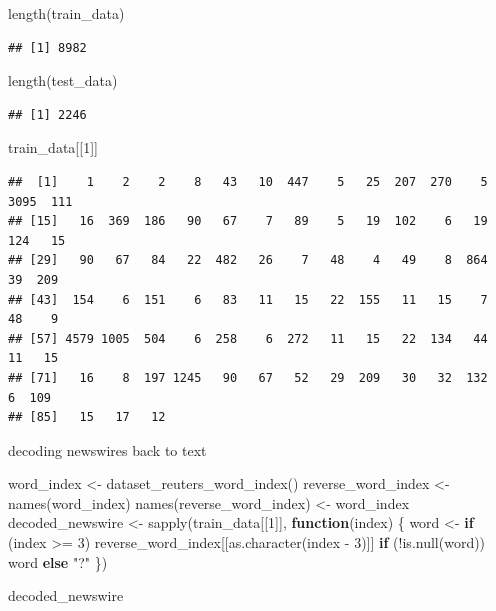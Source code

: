 \documentclass[]{article}
\newenvironment{Shaded}{\begin{snugshade}}{\end{snugshade}}
\newcommand{\ControlFlowTok}[1]{\textcolor[rgb]{0.13,0.29,0.53}{\textbf{#1}}}
\newcommand{\DecValTok}[1]{\textcolor[rgb]{0.00,0.00,0.81}{#1}}
\newcommand{\FunctionTok}[1]{\textcolor[rgb]{0.00,0.00,0.00}{#1}}
\newcommand{\NormalTok}[1]{#1}
\newcommand{\OtherTok}[1]{\textcolor[rgb]{0.56,0.35,0.01}{#1}}
\newcommand{\SpecialCharTok}[1]{\textcolor[rgb]{0.00,0.00,0.00}{#1}}
\newcommand{\StringTok}[1]{\textcolor[rgb]{0.31,0.60,0.02}{#1}}
\begin{document}
\begin{Shaded}
\begin{Highlighting}[]
\FunctionTok{length}\NormalTok{(train\_data)}
\end{Highlighting}
\end{Shaded}

\begin{verbatim}
## [1] 8982
\end{verbatim}

\begin{Shaded}
\begin{Highlighting}[]
\FunctionTok{length}\NormalTok{(test\_data)}
\end{Highlighting}
\end{Shaded}

\begin{verbatim}
## [1] 2246
\end{verbatim}

\begin{Shaded}
\begin{Highlighting}[]
\NormalTok{train\_data[[}\DecValTok{1}\NormalTok{]]}
\end{Highlighting}
\end{Shaded}

\begin{verbatim}
##  [1]    1    2    2    8   43   10  447    5   25  207  270    5 3095  111
## [15]   16  369  186   90   67    7   89    5   19  102    6   19  124   15
## [29]   90   67   84   22  482   26    7   48    4   49    8  864   39  209
## [43]  154    6  151    6   83   11   15   22  155   11   15    7   48    9
## [57] 4579 1005  504    6  258    6  272   11   15   22  134   44   11   15
## [71]   16    8  197 1245   90   67   52   29  209   30   32  132    6  109
## [85]   15   17   12
\end{verbatim}

decoding newswires back to text

\begin{Shaded}
\begin{Highlighting}[]
\NormalTok{word\_index }\OtherTok{\textless{}{-}} \FunctionTok{dataset\_reuters\_word\_index}\NormalTok{()}
\NormalTok{reverse\_word\_index }\OtherTok{\textless{}{-}} \FunctionTok{names}\NormalTok{(word\_index) }
\FunctionTok{names}\NormalTok{(reverse\_word\_index) }\OtherTok{\textless{}{-}}\NormalTok{ word\_index}
\NormalTok{decoded\_newswire }\OtherTok{\textless{}{-}} \FunctionTok{sapply}\NormalTok{(train\_data[[}\DecValTok{1}\NormalTok{]], }\ControlFlowTok{function}\NormalTok{(index) \{}
\NormalTok{  word }\OtherTok{\textless{}{-}} \ControlFlowTok{if}\NormalTok{ (index }\SpecialCharTok{\textgreater{}=} \DecValTok{3}\NormalTok{) reverse\_word\_index[[}\FunctionTok{as.character}\NormalTok{(index }\SpecialCharTok{{-}} \DecValTok{3}\NormalTok{)]]}
  \ControlFlowTok{if}\NormalTok{ (}\SpecialCharTok{!}\FunctionTok{is.null}\NormalTok{(word)) word }\ControlFlowTok{else} \StringTok{"?"} 
\NormalTok{  \})}

\NormalTok{decoded\_newswire}
\end{Highlighting}
\end{Shaded}
\end{document}
